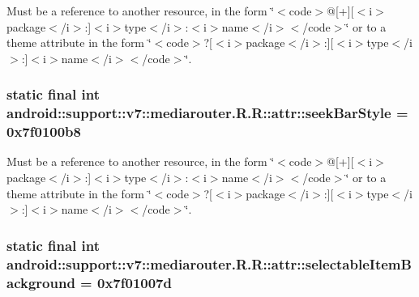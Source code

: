 Must be a reference to another resource, in the form \char`\"{}$<$code$>$@\mbox{[}+\mbox{]}\mbox{[}$<$i$>$package$<$/i$>$:\mbox{]}$<$i$>$type$<$/i$>$:$<$i$>$name$<$/i$>$$<$/code$>$\char`\"{} or to a theme attribute in the form \char`\"{}$<$code$>$?\mbox{[}$<$i$>$package$<$/i$>$:\mbox{]}\mbox{[}$<$i$>$type$<$/i$>$:\mbox{]}$<$i$>$name$<$/i$>$$<$/code$>$\char`\"{}. \hypertarget{classandroid_1_1support_1_1v7_1_1mediarouter_1_1_r_1_1attr_7d5cbc603d50b36333b90f328322d3fa}{
\subsubsection[{seekBarStyle}]{\setlength{\rightskip}{0pt plus 5cm}static final int android::support::v7::mediarouter.R.R::attr::seekBarStyle = 0x7f0100b8}}
\label{classandroid_1_1support_1_1v7_1_1mediarouter_1_1_r_1_1attr_7d5cbc603d50b36333b90f328322d3fa}


Must be a reference to another resource, in the form \char`\"{}$<$code$>$@\mbox{[}+\mbox{]}\mbox{[}$<$i$>$package$<$/i$>$:\mbox{]}$<$i$>$type$<$/i$>$:$<$i$>$name$<$/i$>$$<$/code$>$\char`\"{} or to a theme attribute in the form \char`\"{}$<$code$>$?\mbox{[}$<$i$>$package$<$/i$>$:\mbox{]}\mbox{[}$<$i$>$type$<$/i$>$:\mbox{]}$<$i$>$name$<$/i$>$$<$/code$>$\char`\"{}. \hypertarget{classandroid_1_1support_1_1v7_1_1mediarouter_1_1_r_1_1attr_b852a7bffd27029a855119a2eeef1643}{
\subsubsection[{selectableItemBackground}]{\setlength{\rightskip}{0pt plus 5cm}static final int android::support::v7::mediarouter.R.R::attr::selectableItemBackground = 0x7f01007d}}
\label{classandroid_1_1support_1_1v7_1_1mediarouter_1_1_r_1_1attr_b852a7bffd27029a855119a2eeef1643}


